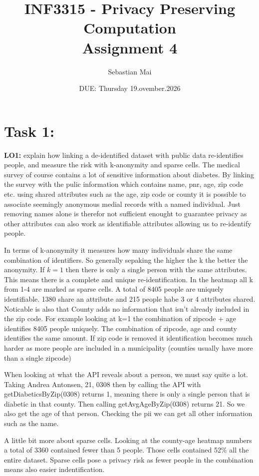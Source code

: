 \documentclass[11pt]{article}
\title{INF3315 - Privacy Preserving Computation \\ \Large Assignment 4}
\author{Sebastian Mai}
\date{DUE: Thursday 19.ovember.2026}
\begin{document}
\maketitle
\doublespacing

\section{Task 1:}
\textbf{LO1:} explain how linking a de-identified dataset with public data re-identifies people, and measure the risk with k-anonymity and sparse cells.
The medical survey of course contains a lot of sensitive information about diabetes. 
By linking the survey with the pulic information which contains name, pnr, age, zip code etc. using shared attributes such as the age, zip code or county it is possible to associate seemingly 
anonymous medial records with a named individual. Just removing names alone is therefor not sufficient enought to guarantee privacy as other attributes can also work as identifiable attributes allowing us to re-identify people.

In terms of k-anonymity it measures how many individuals share the same combination of identifiers. So generally sepaking the higher the k the better the anonymity.
If $k=1$ then there is only a single person with the same attributes. This means there is a complete and unique re-identification.
In the heatmap all k from 1-4 are marked as sparse cells. A total of 8405 people are uniquely identifiable. 1380 share an attribute and 215 people habe 3 or 4 attributes shared. Noticable is also
that County adds no information that isn't already included in the zip code. For example looking at k=1 the combination of zipcode + age identifies 8405 people uniquely. The combination of zipcode, age and county identifies the same amount.
If zip code is removed it identification becomes much harder as more people are included in a municipality (counties usually have more than a single zipcode)

When looking at what the API reveals about a person, we must say quite a lot. Taking Andrea Antonsen, 21, 0308 then by calling the API with 
getDiabeticsByZip(0308) returns 1, meaning there is only a single person that is diabetic in that county. Then calling getAvgAgeByZip(0308) returns 21. So we also get the age of that person. Checking the pii we can get all other information such as the name.

A little bit more about sparse cells. Looking at the county-age heatmap numbers a total of 3360 contained fewer than 5 people. Those cells contained 52\% all the entire dataset.
Sparse cells pose a privacy risk as fewer people in the combination means also easier indentification. 
\end{document}
